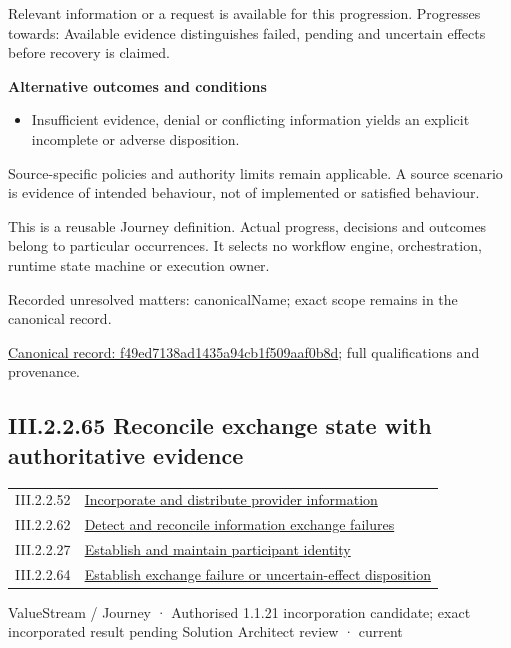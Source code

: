 Relevant information or a request is available for this progression. Progresses towards: Available evidence distinguishes failed, pending and uncertain effects before recovery is claimed.



\par\medskip\textbf{Alternative outcomes and conditions}\par


\begin{itemize}


\item Insufficient evidence, denial or conflicting information yields an explicit incomplete or adverse disposition.

\end{itemize}


Source-specific policies and authority limits remain applicable. A source scenario is evidence of intended behaviour, not of implemented or satisfied behaviour.



This is a reusable Journey definition. Actual progress, decisions and outcomes belong to particular occurrences. It selects no workflow engine, orchestration, runtime state machine or execution owner.


{\small Recorded unresolved matters: canonicalName; exact scope remains in the canonical record.}\par
{\footnotesize \href{../../../../../../../continuum/strategy/value-stream/f49ed7138ad1435a94cb1f509aaf0b8d.md}{Canonical record: f49ed7138ad1435a94cb1f509aaf0b8d}; full qualifications and provenance.}\par
\subsection*{III.2.2.65 Reconcile exchange state with authoritative evidence}
\label{navigation:III.2.2.65}

\begin{longtable}{p{.22\linewidth}p{.73\linewidth}}
III.2.2.52 & \hyperref[element:9eb9f3210d5e4b46ac21463f54e62ab9]{Incorporate and distribute provider information} \\
III.2.2.62 & \hyperref[element:ad3479bfcefb4cc4b562e146f68eb579]{Detect and reconcile information exchange failures} \\
III.2.2.27 & \hyperref[element:f0ce31d5b71c4c5ab37ade566b224808]{Establish and maintain participant identity} \\
III.2.2.64 & \hyperref[element:f49ed7138ad1435a94cb1f509aaf0b8d]{Establish exchange failure or uncertain-effect disposition} \\
\end{longtable}
\label{element:08c2d05dd0174cc28288ed4ab0bc05d2}
{\small ValueStream / Journey · Authorised 1.1.21 incorporation candidate; exact incorporated result pending Solution Architect review · current}\par

